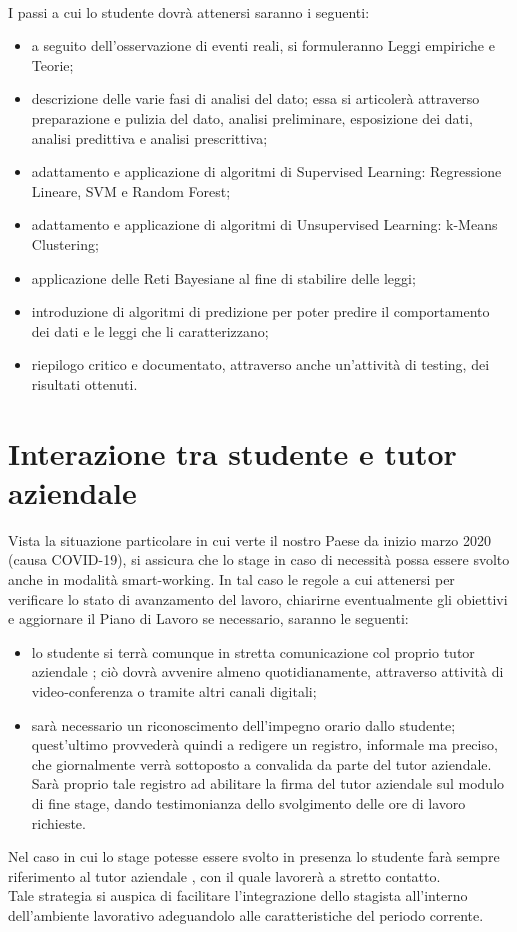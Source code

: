 \\I passi a cui lo studente dovrà attenersi saranno i seguenti:
\begin{itemize}
\item a seguito dell'osservazione di eventi reali, si formuleranno Leggi empiriche e Teorie;
\item descrizione delle varie fasi di analisi del dato; essa si articolerà attraverso preparazione e pulizia del dato, analisi preliminare, esposizione dei dati, analisi predittiva e analisi prescrittiva;  
\item adattamento e applicazione di algoritmi di Supervised Learning: Regressione Lineare, SVM e Random Forest;
\item adattamento e applicazione di algoritmi di Unsupervised Learning: k-Means Clustering;
\item applicazione delle Reti Bayesiane al fine di stabilire delle leggi;
\item introduzione di algoritmi di predizione per poter predire il comportamento dei dati e le leggi che li caratterizzano;
\item riepilogo critico e documentato, attraverso anche un'attività di testing, dei risultati ottenuti.
\end{itemize}

\section{Interazione tra studente e tutor aziendale}
Vista la situazione particolare in cui verte il nostro Paese da inizio marzo 2020 (causa COVID-19), si assicura che lo stage in caso di necessità possa essere svolto anche in modalità smart-working. In tal caso le regole a cui attenersi per verificare lo stato di avanzamento del lavoro, chiarirne eventualmente gli obiettivi e aggiornare il Piano di Lavoro se necessario, saranno le seguenti:
\begin{itemize}
\item lo studente si terrà comunque in stretta comunicazione col proprio tutor aziendale \Greg; ciò dovrà avvenire almeno quotidianamente, attraverso attività di video‐conferenza o tramite altri canali digitali;
\item sarà necessario un riconoscimento dell'impegno orario dallo studente; quest'ultimo provvederà quindi a redigere un registro, informale ma preciso, che giornalmente verrà sottoposto a convalida da parte del tutor aziendale. Sarà proprio tale registro ad abilitare la firma del tutor aziendale sul modulo di fine stage, dando testimonianza dello svolgimento delle ore di lavoro richieste.
\end{itemize}  
Nel caso in cui lo stage potesse essere svolto in presenza lo studente farà sempre riferimento al tutor aziendale \Greg{}, con il quale lavorerà a stretto contatto. \\Tale strategia si auspica di facilitare l'integrazione dello stagista all'interno dell'ambiente lavorativo adeguandolo alle caratteristiche del periodo corrente.

